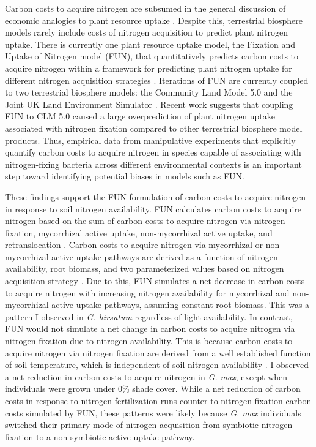Carbon costs to acquire nitrogen are subsumed in the general discussion of economic analogies to plant resource uptake . Despite this, terrestrial biosphere models rarely include costs of nitrogen acquisition to predict plant nitrogen uptake. There is currently one plant resource uptake model, the Fixation and Uptake of Nitrogen model (FUN), that quantitatively predicts carbon costs to acquire nitrogen within a framework for predicting plant nitrogen uptake for different nitrogen acquisition strategies . Iterations of FUN are currently coupled to two terrestrial biosphere models: the Community Land Model 5.0 and the Joint UK Land Environment Simulator . Recent work suggests that coupling FUN to CLM 5.0 caused a large overprediction of plant nitrogen uptake associated with nitrogen fixation  compared to other terrestrial biosphere model products. Thus, empirical data from manipulative experiments that explicitly quantify carbon costs to acquire nitrogen in species capable of associating with nitrogen-fixing bacteria across different environmental contexts is an important step toward identifying potential biases in models such as FUN.

These findings support the FUN formulation of carbon costs to acquire nitrogen in response to soil nitrogen availability. FUN calculates carbon costs to acquire nitrogen based on the sum of carbon costs to acquire nitrogen via nitrogen fixation, mycorrhizal active uptake, non-mycorrhizal active uptake, and retranslocation . Carbon costs to acquire nitrogen via mycorrhizal or non-mycorrhizal active uptake pathways are derived as a function of nitrogen availability, root biomass, and two parameterized values based on nitrogen acquisition strategy . Due to this, FUN simulates a net decrease in carbon costs to acquire nitrogen with increasing nitrogen availability for mycorrhizal and non-mycorrhizal active uptake pathways, assuming constant root biomass. This was a pattern I observed in \textit{G. hirsutum} regardless of light availability. In contrast, FUN would not simulate a net change in carbon costs to acquire nitrogen via nitrogen fixation due to nitrogen availability. This is because carbon costs to acquire nitrogen via nitrogen fixation are derived from a well established function of soil temperature, which is independent of soil nitrogen availability . I observed a net reduction in carbon costs to acquire nitrogen in \textit{G. max}, except when individuals were grown under 0\% shade cover. While a net reduction of carbon costs in response to nitrogen fertilization runs counter to nitrogen fixation carbon costs simulated by FUN, these patterns were likely because \textit{G. max} individuals switched their primary mode of nitrogen acquisition from symbiotic nitrogen fixation to a non-symbiotic active uptake pathway.

